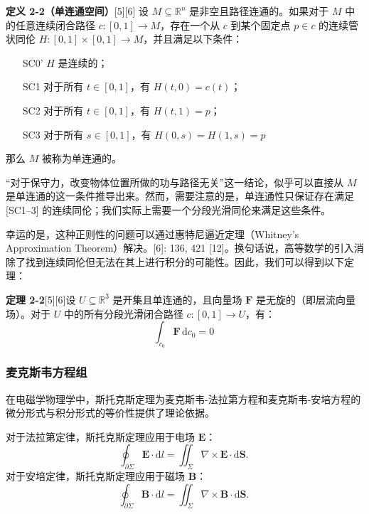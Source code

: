 \textbf{定义 2-2（单连通空间）}[5][6]  设 \(M \subseteq \mathbb{R}^n\) 是非空且路径连通的。如果对于 \(M\) 中的任意连续闭合路径 \(c: [0, 1] \to M\)，存在一个从 \(c\) 到某个固定点 \(p \in c\) 的连续管状同伦 \(H: [0, 1] \times [0, 1] \to M\)，并且满足以下条件：

\begin{itemize}
\item [SC0'] \(H\) 是连续的；
\item [SC1] 对于所有 \(t \in [0, 1]\)，有 \(H(t, 0) = c(t)\)；
\item [SC2] 对于所有 \(t \in [0, 1]\)，有 \(H(t, 1) = p\)；
\item [SC3] 对于所有 \(s \in [0, 1]\)，有 \(H(0, s) = H(1, s) = p\)
\end{itemize}

那么 \(M\) 被称为单连通的。

“对于保守力，改变物体位置所做的功与路径无关”这一结论，似乎可以直接从 \(M\) 是单连通的这一条件推导出来。然而，需要注意的是，单连通性只保证存在满足 [SC1–3] 的连续同伦；我们实际上需要一个分段光滑同伦来满足这些条件。

幸运的是，这种正则性的问题可以通过惠特尼逼近定理（Whitney's Approximation Theorem）解决。[6]: 136, 421 [12]。换句话说，高等数学的引入消除了找到连续同伦但无法在其上进行积分的可能性。因此，我们可以得到以下定理：

\textbf{定理 2-2}[5][6]设 \(U \subseteq \mathbb{R}^3\) 是开集且单连通的，且向量场 \(\mathbf{F}\) 是无旋的（即层流向量场）。对于 \(U\) 中的所有分段光滑闭合路径 \(c: [0, 1] \to U\)，有：
\[
\int_{c_0} \mathbf{F} \, \mathrm{d}c_0 = 0~
\]
\subsubsection{麦克斯韦方程组}
在电磁学物理学中，斯托克斯定理为麦克斯韦-法拉第方程和麦克斯韦-安培方程的微分形式与积分形式的等价性提供了理论依据。

对于法拉第定律，斯托克斯定理应用于电场 \(\mathbf{E}\)：
\[
\oint_{\partial \Sigma} \mathbf{E} \cdot \mathrm{d} l = \iint_{\Sigma} \nabla \times \mathbf{E} \cdot \mathrm{d} \mathbf{S}.~
\]
对于安培定律，斯托克斯定理应用于磁场 \(\mathbf{B}\)：
\[
\oint_{\partial \Sigma} \mathbf{B} \cdot \mathrm{d} l = \iint_{\Sigma} \nabla \times \mathbf{B} \cdot \mathrm{d} \mathbf{S}.~
\]